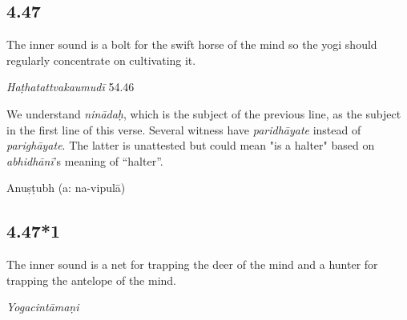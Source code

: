 \begin{ekdosis}
\subsection*{4.47}
\begin{translation}[hp04_047]
The inner sound is a bolt for the swift horse of the mind so the yogi should regularly concentrate on cultivating it.
\end{translation}


\begin{testimonia}[hp04_047]
\emph{Haṭhatattvakaumudī} 54.46
\begin{versinnote}
\end{versinnote}
\end{testimonia}

\begin{philcomm}[hp04_047]
We understand \textit{ninādaḥ}, which is the subject of the previous line, as the subject in the first line of this verse. Several witness have \emph{paridhāyate} instead of \emph{parighāyate}. The latter is unattested but could mean "is a halter" based on \emph{abhidhānī}’s meaning of “halter”.
\end{philcomm}

\begin{metre}[hp04_047]
Anuṣṭubh (a: na-vipulā)
\end{metre}

\subsection*{4.47*1}
\begin{translation}[hp04_047_1]
The inner sound is a net for trapping the deer of the mind and a hunter for trapping the antelope of the mind.
\end{translation}


\begin{testimonia}[hp04_047_1]
\emph{Yogacintāmaṇi}
\begin{versinnote}
\end{versinnote}


\end{testimonia}
\end{ekdosis}
